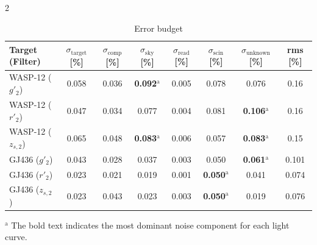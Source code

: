 \documentclass[a4paper,12pt]{spieman}  %
\begin{document}
\begin{spacing}{2}
\begin{table}[t]
\begin{center}
\small
\caption{Error budget
\label{tbl:error_budget}}
\vspace{5pt}
\begin{tabular}{lccccccc}
\hline
\hline
Target (Filter) & $\sigma_\mathrm{target}$ [\%]& $\sigma_\mathrm{comp}$ [\%]& $\sigma_\mathrm{sky}$ [\%]& $\sigma_\mathrm{read}$ [\%]& $\sigma_\mathrm{scin}$ [\%]& $\sigma_\mathrm{unknown}$ [\%]& rms [\%]\\ 
\hline
WASP-12 ($g'_2$) & 0.058 & 0.036 & {\bf 0.092}$^\mathrm{a}$ & 0.005 & 0.078 & 0.076 & 0.16\\
WASP-12 ($r'_2$) & 0.047 & 0.034 & 0.077 & 0.004 & 0.081 & {\bf 0.106}$^\mathrm{a}$ & 0.16\\
WASP-12 ($z_{s,2}$) & 0.065 & 0.048 & {\bf 0.083}$^\mathrm{a}$ & 0.006 & 0.057 & {\bf 0.083}$^\mathrm{a}$ & 0.15\\
GJ436 ($g'_2$) & 0.043 & 0.028 & 0.037 & 0.003 & 0.050 & {\bf 0.061}$^\mathrm{a}$ & 0.101\\
GJ436 ($r'_2$) & 0.023 & 0.021 & 0.019 & 0.001 & {\bf 0.050}$^\mathrm{a}$ & 0.041 & 0.074\\
GJ436 ($z_{s,2}$) & 0.023 & 0.043 & 0.023 & 0.003 & {\bf 0.050}$^\mathrm{a}$ & 0.019 & 0.076\\
\hline
\end{tabular}
\end{center}
{\footnotesize
$^\mathrm{a}$ The bold text indicates the most dominant noise component for each light curve.
}
\end{table}



\end{spacing}
\end{document}
